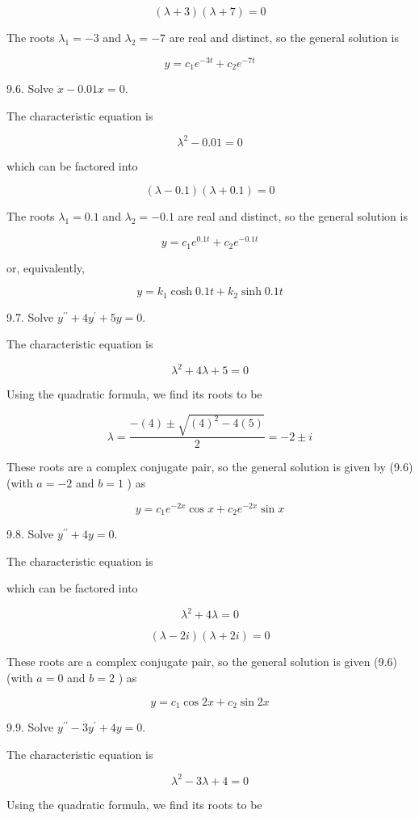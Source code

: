 \documentclass[10pt]{article}
\begin{document}
$$
(\lambda+3)(\lambda+7)=0
$$

The roots $\lambda_{1}=-3$ and $\lambda_{2}=-7$ are real and distinct, so the general solution is

$$
y=c_{1} e^{-3 t}+c_{2} e^{-7 t}
$$

9.6. Solve $\ddot{x}-0.01 x=0$.

The characteristic equation is

$$
\lambda^{2}-0.01=0
$$

which can be factored into

$$
(\lambda-0.1)(\lambda+0.1)=0
$$

The roots $\lambda_{1}=0.1$ and $\lambda_{2}=-0.1$ are real and distinct, so the general solution is

$$
y=c_{1} e^{0.1 t}+c_{2} e^{-0.1 t}
$$

or, equivalently,

$$
y=k_{1} \cosh 0.1 t+k_{2} \sinh 0.1 t
$$

9.7. Solve $y^{\prime \prime}+4 y^{\prime}+5 y=0$.

The characteristic equation is

$$
\lambda^{2}+4 \lambda+5=0
$$

Using the quadratic formula, we find its roots to be

$$
\lambda=\frac{-(4) \pm \sqrt{(4)^{2}-4(5)}}{2}=-2 \pm i
$$

These roots are a complex conjugate pair, so the general solution is given by (9.6) (with $a=-2$ and $b=1$ ) as

$$
y=c_{1} e^{-2 x} \cos x+c_{2} e^{-2 x} \sin x
$$

9.8. Solve $y^{\prime \prime}+4 y=0$.

The characteristic equation is

which can be factored into

$$
\lambda^{2}+4 \lambda=0
$$

$$
(\lambda-2 i)(\lambda+2 i)=0
$$

These roots are a complex conjugate pair, so the general solution is given (9.6) (with $a=0$ and $b=2$ ) as

$$
y=c_{1} \cos 2 x+c_{2} \sin 2 x
$$

9.9. Solve $y^{\prime \prime}-3 y^{\prime}+4 y=0$.

The characteristic equation is

$$
\lambda^{2}-3 \lambda+4=0
$$

Using the quadratic formula, we find its roots to be
\end{document}
